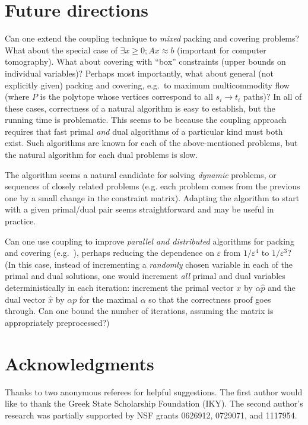 \documentclass[11pt]{svjour3} \usepackage{fullpage}
\newcommand{\primalOf}[1]{{{#1}}}
\newcommand{\dualOf}[1]{{\hat{#1}}}
\newcommand{\xp}{\primalOf x}
\newcommand{\pp}{\primalOf p}
\newcommand{\xd}{\dualOf x}
\newcommand{\pd}{\dualOf p}
\newcommand{\eps}{\varepsilon}
\begin{document}
\section{Future directions}\label{sec:conclusion}
Can one extend the coupling technique to {\em mixed} packing and covering problems?
What about the special case of $\exists x \ge 0; Ax \approx b$ (important for computer tomography).
What about covering with ``box'' constraints (upper bounds on individual variables)?
Perhaps most importantly, 
what about general (not explicitly given)
packing and covering, e.g.~to maximum multicommodity flow (where $P$ is the polytope whose vertices correspond to all $s_i\rightarrow t_i$ paths)?  
In all of these cases, correctness of a natural algorithm is easy to establish, 
but the running time is problematic.
This seems to be because the coupling approach requires 
that fast primal {\em and} dual algorithms of a particular kind must both exist.
Such algorithms are known for each of the above-mentioned problems,
but the natural algorithm for each dual problems is slow.

The algorithm seems a natural candidate for solving {\em dynamic} problems, 
or sequences of closely related problems (e.g. each problem comes from the previous one by a small change in the constraint matrix).
Adapting the algorithm to start with a given primal/dual pair seems straightforward
and may be useful in practice.

Can one use coupling to improve {\em parallel and distributed} algorithms for packing and covering (e.g.~\cite{Luby93Parallel,Young01Sequential}), perhaps reducing the dependence on $\eps$ from $1/\eps^4$ to $1/\eps^3$?
(In this case, instead of incrementing a {\em randomly} chosen variable in each of the primal and dual solutions,
one would increment {\em all} primal and dual variables deterministically 
in each iteration:
increment the primal vector $\xp$ by $\alpha \pd$
and the dual vector $\xd$ by $\alpha\pp$ for the maximal $\alpha$
so that the correctness proof goes through.
Can one bound the number of iterations, assuming the matrix is appropriately preprocessed?)

\section*{Acknowledgments}
Thanks to two anonymous referees for helpful suggestions.
The first author would like to thank the Greek State Scholarship Foundation (IKY).
The second author's research was partially supported by
NSF grants 0626912, 0729071, and 1117954.
\end{document}

